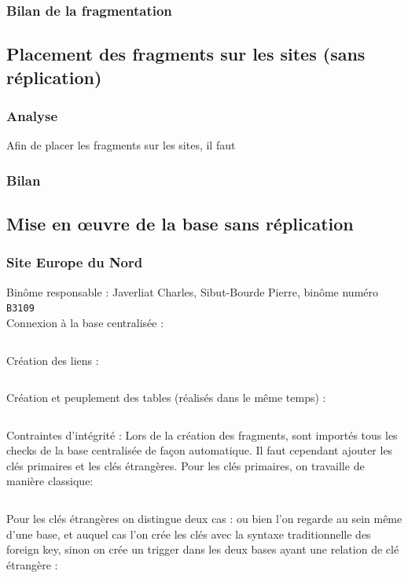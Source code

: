 \documentclass[10pt,a4paper]{article}
\theoremstyle{plain}
\begin{document}
\subsubsection{Bilan de la fragmentation}

\subsection{Placement des fragments sur les sites (sans réplication)}
\subsubsection{Analyse}
Afin de placer les fragments sur les sites, il faut 
\subsubsection{Bilan}

\newpage
\subsection{Mise en \oe uvre de la base sans réplication}
\subsubsection{Site Europe du Nord}
Binôme responsable : Javerliat Charles, Sibut-Bourde Pierre, binôme numéro \verb|B3109|\\

Connexion à la base centralisée :
\inputminted{sql}{EUN_connexion_db_ryori.sql}
\newpage

Création des liens :
\inputminted{sql}{INSA-DB12-EuropeNord-creation-liens-db.sql}
\newpage 

Création et peuplement des tables (réalisés dans le même temps) :\\
\inputminted{sql}{INSA-DB12-EuropeNord-fragmentation.sql}
\newpage 

Contraintes d'intégrité : Lors de la création des fragments, sont importés tous les checks de la base centralisée de façon automatique. Il faut cependant ajouter les clés primaires et les clés étrangères. Pour les clés primaires, on travaille de manière classique:\\
\inputminted{sql}{INSA-DB12-EuropeNord-contraintes-pk.sql}

\newpage

Pour les clés étrangères on distingue deux cas : ou bien l'on regarde au sein même d'une base, et auquel cas l'on crée les clés avec la syntaxe traditionnelle des foreign key, sinon on crée un trigger dans les deux bases ayant une relation de clé étrangère :\\
\end{document}
